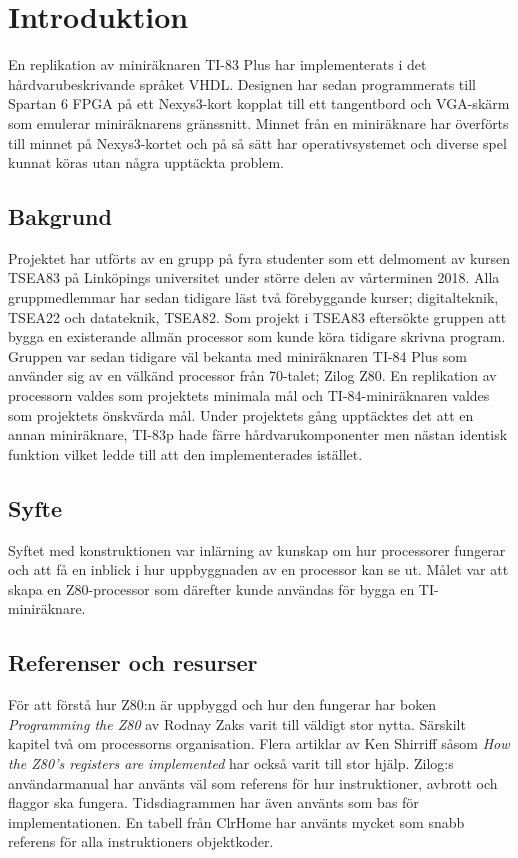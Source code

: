 \documentclass[main.tex]{subfiles}
\begin{document}
\section{Introduktion}
En replikation av miniräknaren TI-83 Plus har implementerats i det
hårdvarubeskrivande språket VHDL. Designen har sedan programmerats till Spartan
6 FPGA på ett Nexys3-kort kopplat till ett tangentbord och VGA-skärm som
emulerar miniräknarens gränssnitt. Minnet från en miniräknare har överförts
till minnet på Nexys3-kortet och på så sätt har operativsystemet och diverse
spel kunnat köras utan några upptäckta problem.

\subsection{Bakgrund}
Projektet har utförts av en grupp på fyra studenter som ett delmoment av kursen
TSEA83 på Linköpings universitet under större delen av vårterminen 2018. Alla
gruppmedlemmar har sedan tidigare läst två förebyggande kurser; digitalteknik,
TSEA22 och datateknik, TSEA82. Som projekt i TSEA83 eftersökte gruppen att
bygga en existerande allmän processor som kunde köra tidigare skrivna program.
Gruppen var sedan tidigare väl bekanta med miniräknaren TI-84 Plus som använder
sig av en välkänd processor från 70-talet; Zilog Z80. En replikation av
processorn valdes som projektets minimala mål och TI-84-miniräknaren valdes som
projektets önskvärda mål. Under projektets gång upptäcktes det att en annan
miniräknare, TI-83p hade färre hårdvarukomponenter men nästan identisk funktion
vilket ledde till att den implementerades istället.

\subsection{Syfte}
Syftet med konstruktionen var inlärning av kunskap om hur processorer fungerar
och att få en inblick i hur uppbyggnaden av en processor kan se ut. Målet var
att skapa en Z80-processor som därefter kunde användas för bygga en
TI-miniräknare.

\subsection{Referenser och resurser}
För att förstå hur Z80:n är uppbyggd och hur den fungerar har boken {\it
Programming the Z80}\cite{zaks-z80prog} av Rodnay Zaks varit till väldigt stor
nytta. Särskilt kapitel två om processorns organisation. Flera artiklar av Ken
Shirriff såsom {\it How the Z80's registers are implemented}\cite{shirriff-reg}
har också varit till stor hjälp. Zilog:s användarmanual\cite{z80um} har använts
väl som referens för hur instruktioner, avbrott och flaggor ska fungera.
Tidsdiagrammen har även använts som bas för implementationen. En tabell från
ClrHome\cite{clrhome} har använts mycket som snabb referens för alla
instruktioners objektkoder.
\end{document}
